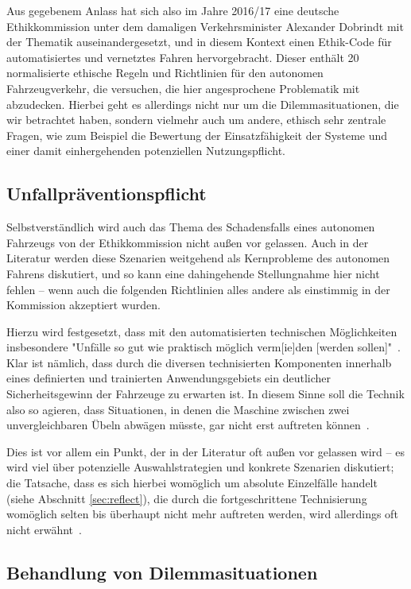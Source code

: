 \documentclass[twocolumn, german]{tum-article}
\begin{document}
Aus gegebenem Anlass hat sich also im Jahre 2016/17 eine deutsche Ethikkommission unter dem damaligen Verkehrsminister Alexander Dobrindt mit der Thematik auseinandergesetzt, und in diesem Kontext einen Ethik-Code für automatisiertes und vernetztes Fahren hervorgebracht.
Dieser enthält 20 normalisierte ethische Regeln und Richtlinien für den autonomen Fahrzeugverkehr, die versuchen, die hier angesprochene Problematik mit abzudecken.
Hierbei geht es allerdings nicht nur um die Dilemmasituationen, die wir betrachtet haben, sondern vielmehr auch um andere, ethisch sehr zentrale Fragen, wie zum Beispiel die Bewertung der Einsatzfähigkeit der Systeme und einer damit einhergehenden potenziellen Nutzungspflicht.


\subsection{Unfallpräventionspflicht}
Selbstverständlich wird auch das Thema des Schadensfalls eines autonomen Fahrzeugs von der Ethikkommission nicht außen vor gelassen.
Auch in der Literatur werden diese Szenarien weitgehend als Kernprobleme des autonomen Fahrens diskutiert, und so kann eine dahingehende Stellungnahme hier nicht fehlen -- wenn auch die folgenden Richtlinien alles andere als einstimmig in der Kommission akzeptiert wurden.

Hierzu wird festgesetzt, dass mit den automatisierten technischen Möglichkeiten insbesondere "Unfälle so gut wie praktisch möglich verm[ie]den [werden sollen]"~\cite[S. 10]{ethik-komission}.
Klar ist nämlich, dass durch die diversen technisierten Komponenten innerhalb eines definierten und trainierten Anwendungsgebiets ein deutlicher Sicherheitsgewinn der Fahrzeuge zu erwarten ist.
In diesem Sinne soll die Technik also so agieren, dass Situationen, in denen die Maschine zwischen zwei unvergleichbaren Übeln abwägen müsste, gar nicht erst auftreten können~\cite[S. 10]{ethik-komission}.

Dies ist vor allem ein Punkt, der in der Literatur oft außen vor gelassen wird -- es wird viel über potenzielle Auswahlstrategien und konkrete Szenarien diskutiert; die Tatsache, dass es sich hierbei womöglich um absolute Einzelfälle handelt (siehe Abschnitt \vref{sec:reflect}), die durch die fortgeschrittene Technisierung womöglich selten bis überhaupt nicht mehr auftreten werden, wird allerdings oft nicht erwähnt~\cite[S. 551]{ethics-code}.


\subsection{Behandlung von Dilemmasituationen}
\end{document}
